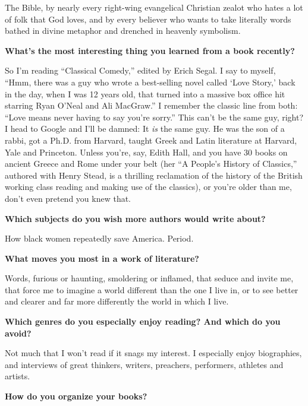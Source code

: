 The Bible, by nearly every right-wing evangelical Christian zealot who
hates a lot of folk that God loves, and by every believer who wants to
take literally words bathed in divine metaphor and drenched in heavenly
symbolism.

\textbf{What's the most interesting thing you learned from a book
recently?}

So I'm reading ``Classical Comedy,'' edited by Erich Segal. I say to
myself, ``Hmm, there was a guy who wrote a best-selling novel called
`Love Story,' back in the day, when I was 12 years old, that turned into
a massive box office hit starring Ryan O'Neal and Ali MacGraw.'' I
remember the classic line from both: ``Love means never having to say
you're sorry.'' This can't be the same guy, right? I head to Google and
I'll be damned: It \emph{is} the same guy. He was the son of a rabbi,
got a Ph.D. from Harvard, taught Greek and Latin literature at Harvard,
Yale and Princeton. Unless you're, say, Edith Hall, and you have 30
books on ancient Greece and Rome under your belt (her ``A People's
History of Classics,'' authored with Henry Stead, is a thrilling
reclamation of the history of the British working class reading and
making use of the classics), or you're older than me, don't even pretend
you knew that.

\textbf{Which subjects do you wish more authors would write about?}

How black women repeatedly save America. Period.

\textbf{What moves you most in a work of literature?}

Words, furious or haunting, smoldering or inflamed, that seduce and
invite me, that force me to imagine a world different than the one I
live in, or to see better and clearer and far more differently the world
in which I live.

\textbf{Which genres do you especially enjoy reading? And which do you
avoid?}

Not much that I won't read if it snags my interest. I especially enjoy
biographies, and interviews of great thinkers, writers, preachers,
performers, athletes and artists.

\textbf{How do you organize your books?}

